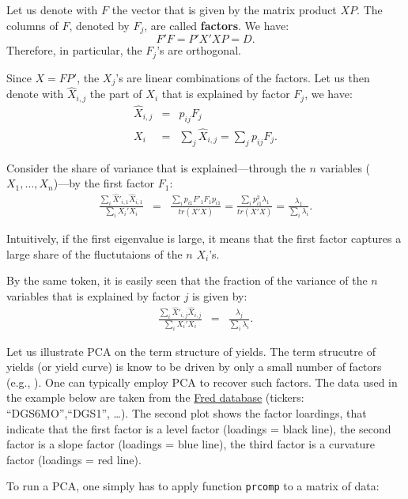 \documentclass[
  12pt,
]{book}
\theoremstyle{definition}
\theoremstyle{definition}
\theoremstyle{definition}
\theoremstyle{definition}
\theoremstyle{remark}
\begin{document}
Let us denote with \(F\) the vector that is given by the matrix product \(XP\). The columns of \(F\), denoted by \(F_{j}\), are called \textbf{factors}. We have:
\[
F'F=P'X'XP=D.
\]
Therefore, in particular, the \(F_{j}\)'s are orthogonal.

Since \(X=FP'\), the \(X_{j}\)'s are linear combinations of the factors. Let us then denote with \(\hat{X}_{i,j}\) the part of \(X_{i}\) that is explained by factor \(F_{j}\), we have:
\begin{eqnarray*}
\hat{X}_{i,j} & = & p_{ij}F_{j}\\
X_{i} & = & \sum_{j}\hat{X}_{i,j}=\sum_{j}p_{ij}F_{j}.
\end{eqnarray*}

Consider the share of variance that is explained---through the \(n\) variables (\(X_{1},\ldots,X_{n}\))---by the first factor \(F_{1}\):
\begin{eqnarray*}
\frac{\sum_{i}\hat{X}'_{i,1}\hat{X}_{i,1}}{\sum_{i}X_{i}'X_{i}} & = & \frac{\sum_{i}p_{i1}F'_{1}F_{1}p_{i1}}{tr(X'X)} = \frac{\sum_{i}p_{i1}^{2}\lambda_{1}}{tr(X'X)} = \frac{\lambda_{1}}{\sum_{i}\lambda_{i}}.
\end{eqnarray*}

Intuitively, if the first eigenvalue is large, it means that the first factor captures a large share of the fluctutaions of the \(n\) \(X_{i}\)'s.

By the same token, it is easily seen that the fraction of the variance of the \(n\) variables that is explained by factor \(j\) is given by:
\begin{eqnarray*}
\frac{\sum_{i}\hat{X}'_{i,j}\hat{X}_{i,j}}{\sum_{i}X_{i}'X_{i}} & = & \frac{\lambda_{j}}{\sum_{i}\lambda_{i}}.
\end{eqnarray*}

Let us illustrate PCA on the term structure of yields. The term strucutre of yields (or yield curve) is know to be driven by only a small number of factors (e.g., \citet{Litterman_Scheinkman_1991}). One can typically employ PCA to recover such factors. The data used in the example below are taken from the \href{https://fred.stlouisfed.org}{Fred database} (tickers: ``DGS6MO'',``DGS1'', \ldots). The second plot shows the factor loardings, that indicate that the first factor is a level factor (loadings = black line), the second factor is a slope factor (loadings = blue line), the third factor is a curvature factor (loadings = red line).

To run a PCA, one simply has to apply function \texttt{prcomp} to a matrix of data:
\end{document}
